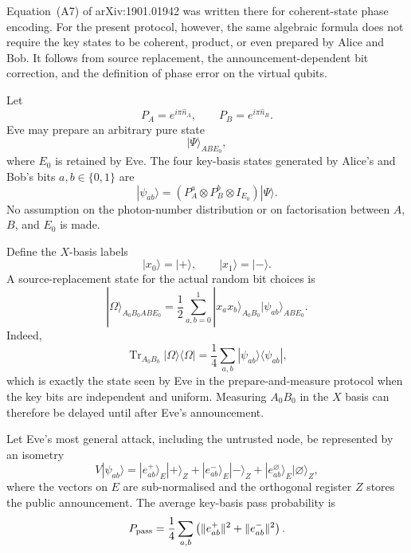 \documentclass[11pt]{article}
\theoremstyle{remark}
\begin{document}
Equation~(A7) of arXiv:1901.01942 was written there for coherent-state
phase encoding.  For the present protocol, however, the same algebraic
formula does not require the key states to be coherent, product, or even
prepared by Alice and Bob.  It follows from source replacement, the
announcement-dependent bit correction, and the definition of phase error on
the virtual qubits.

Let
\[
    P_A=e^{i\pi\hat n_A},
    \qquad
    P_B=e^{i\pi\hat n_B}.
\]
Eve may prepare an arbitrary pure state
\[
    |\Psi\rangle_{ABE_0},
\]
where \(E_0\) is retained by Eve.  The four key-basis states generated by
Alice's and Bob's bits \(a,b\in\{0,1\}\) are
\begin{equation}
    |\psi_{ab}\rangle
    =
    (P_A^a\otimes P_B^b\otimes I_{E_0})
    |\Psi\rangle.
    \label{eq:a7-key-states-general}
\end{equation}
No assumption on the photon-number distribution or on factorisation between
\(A\), \(B\), and \(E_0\) is made.

Define the \(X\)-basis labels
\[
    |x_0\rangle=|+\rangle,
    \qquad
    |x_1\rangle=|-\rangle.
\]
A source-replacement state for the actual random bit choices is
\begin{equation}
    |\Omega\rangle_{A_0B_0ABE_0}
    =
    \frac12
    \sum_{a,b=0}^1
    |x_a x_b\rangle_{A_0B_0}
    |\psi_{ab}\rangle_{ABE_0}.
    \label{eq:a7-source-replacement}
\end{equation}
Indeed,
\begin{equation}
    \operatorname{Tr}_{A_0B_0}
    |\Omega\rangle\!\langle\Omega|
    =
    \frac14
    \sum_{a,b}
    |\psi_{ab}\rangle\!\langle\psi_{ab}|,
    \label{eq:a7-eve-equivalence}
\end{equation}
which is exactly the state seen by Eve in the prepare-and-measure protocol
when the key bits are independent and uniform.  Measuring \(A_0B_0\) in the
\(X\) basis can therefore be delayed until after Eve's announcement.

Let Eve's most general attack, including the untrusted node, be represented
by an isometry
\begin{equation}
    V|\psi_{ab}\rangle
    =
    |e^+_{ab}\rangle_E|+\rangle_Z
    +
    |e^-_{ab}\rangle_E|-\rangle_Z
    +
    |e^\varnothing_{ab}\rangle_E|\varnothing\rangle_Z,
    \label{eq:a7-attack-isometry}
\end{equation}
where the vectors on \(E\) are sub-normalised and the orthogonal register
\(Z\) stores the public announcement.  The average key-basis pass probability
is
\begin{equation}
    P_{\rm pass}
    =
    \frac14
    \sum_{a,b}
    \left(
      \|e^+_{ab}\|^2+\|e^-_{ab}\|^2
    \right).
    \label{eq:a7-ppass-general}
\end{equation}
\end{document}
